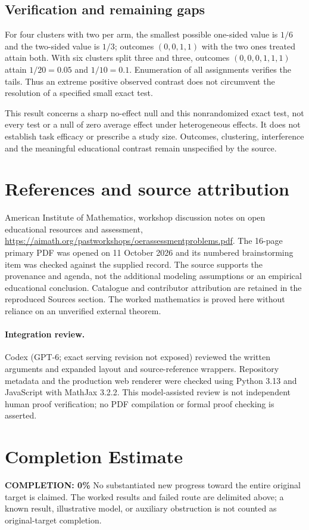 \documentclass[11pt]{article}
\begin{document}
\subsection{Verification and remaining gaps}
For four clusters with two per arm, the smallest possible one-sided value is $1/6$ and the two-sided value is $1/3$; outcomes $(0,0,1,1)$ with the two ones treated attain both. With six clusters split three and three, outcomes $(0,0,0,1,1,1)$ attain $1/20=0.05$ and $1/10=0.1$. Enumeration of all assignments verifies the tails. Thus an extreme positive observed contrast does not circumvent the resolution of a specified small exact test.

This result concerns a sharp no-effect null and this nonrandomized exact test, not every test or a null of zero average effect under heterogeneous effects. It does not establish task efficacy or prescribe a study size. Outcomes, clustering, interference and the meaningful educational contrast remain unspecified by the source.

\section{References and source attribution}
American Institute of Mathematics, workshop discussion notes on open educational resources and assessment, \url{https://aimath.org/pastworkshops/oerassessmentproblems.pdf}. The 16-page primary PDF was opened on 11 October 2026 and its numbered brainstorming item was checked against the supplied record. The source supports the provenance and agenda, not the additional modeling assumptions or an empirical educational conclusion. Catalogue and contributor attribution are retained in the reproduced Sources section. The worked mathematics is proved here without reliance on an unverified external theorem.


\paragraph{Integration review.} Codex (GPT-6; exact serving revision not exposed) reviewed the written arguments and expanded layout and source-reference wrappers. Repository metadata and the production web renderer were checked using Python 3.13 and JavaScript with MathJax 3.2.2. This model-assisted review is not independent human proof verification; no PDF compilation or formal proof checking is asserted.

\section{Completion Estimate}
\noindent\textbf{COMPLETION: 0\%}
No substantiated new progress toward the entire original target is claimed. The worked results and failed route are delimited above; a known result, illustrative model, or auxiliary obstruction is not counted as original-target completion.
\end{document}
